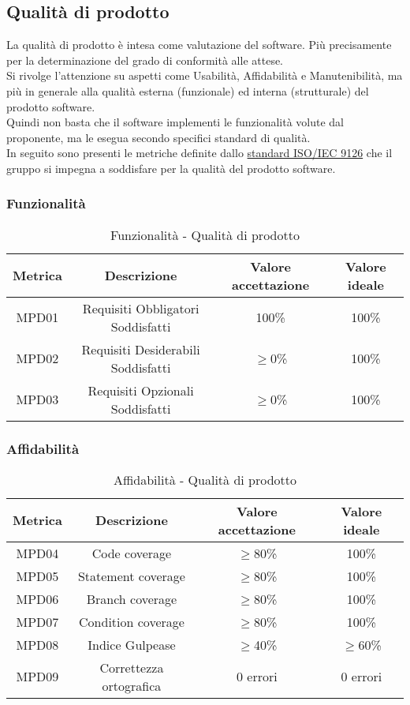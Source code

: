 \documentclass[11pt]{article}
\begin{document}
\begin{justify}
\subsection{Qualità di prodotto}\label{qpd}
La qualità di prodotto è intesa come valutazione del software. Più precisamente per la determinazione del grado di conformità alle attese.\\
Si rivolge l'attenzione su aspetti come Usabilità, Affidabilità e Manutenibilità, ma più in generale alla qualità esterna (funzionale) ed interna (strutturale) del prodotto software.\\
Quindi non basta che il software implementi le funzionalità volute dal proponente, ma le esegua secondo specifici standard di qualità.\\
In seguito sono presenti le metriche definite dallo \hyperref[ISO 9126]{standard ISO/IEC 9126} che il gruppo si impegna a soddisfare per la qualità del prodotto software.
\subsubsection{Funzionalità}
\begin{table}[H]
  \centering
\begin{tabular}{|c|c|c|c|}
  \hline
  \textbf{Metrica} & \textbf{Descrizione} & \textbf{Valore accettazione} & \textbf{Valore ideale}\\
  \hline
  MPD01 & Requisiti Obbligatori Soddisfatti & 100\% & 100\%\\
  \hline
  MPD02 & Requisiti Desiderabili Soddisfatti  & $\geq$0\% & 100\% \\
  \hline
  MPD03 & Requisiti Opzionali Soddisfatti & $\geq$0\% & 100\% \\
  \hline
\end{tabular}
\caption{Funzionalità - Qualità di prodotto}
\label{tab:funzionalità}
\end{table}

\subsubsection{Affidabilità}
\begin{table}[H]
  \centering
\begin{tabular}{|c|c|c|c|}
  \hline
  \textbf{Metrica} & \textbf{Descrizione} & \textbf{Valore accettazione} & \textbf{Valore ideale}\\
  \hline
  MPD04 & Code coverage & $\geq$80\% & 100\% \\
  \hline
  MPD05 & Statement coverage & $\geq$80\% & 100\% \\
  \hline
  MPD06 & Branch coverage & $\geq$80\% & 100\% \\
  \hline
  MPD07 & Condition coverage & $\geq$80\% & 100\% \\
  \hline
  MPD08 & Indice Gulpease & $\geq$40\% & $\geq$60\% \\
  \hline
  MPD09 & Correttezza ortografica & 0 errori & 0 errori \\
  \hline
\end{tabular}
\caption{Affidabilità - Qualità di prodotto}
\label{tab:affidabilità}
\end{table}


\end{justify}
\end{document}
